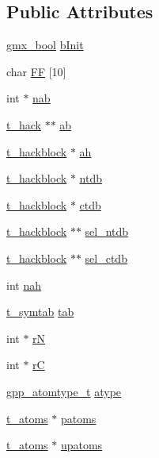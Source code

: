 \subsection*{\-Public \-Attributes}
\begin{DoxyCompactItemize}
\item 
\hyperlink{include_2types_2simple_8h_a8fddad319f226e856400d190198d5151}{gmx\-\_\-bool} \hyperlink{structt__protonate_a8290815626bfc9c61018e18676c82664}{b\-Init}
\item 
char \hyperlink{structt__protonate_ad3acc79a6fc03e541a71b2d74352855d}{\-F\-F} \mbox{[}10\mbox{]}
\item 
int $\ast$ \hyperlink{structt__protonate_a4857a140a9f0d6740dfe772ed4524b62}{nab}
\item 
\hyperlink{structt__hack}{t\-\_\-hack} $\ast$$\ast$ \hyperlink{structt__protonate_aff0d02f8787f57c387e52de040c5e402}{ab}
\item 
\hyperlink{structt__hackblock}{t\-\_\-hackblock} $\ast$ \hyperlink{structt__protonate_a9a1267245f8d9e479835de82909f5233}{ah}
\item 
\hyperlink{structt__hackblock}{t\-\_\-hackblock} $\ast$ \hyperlink{structt__protonate_a2c4add1c540a11ab1c69e956a4cb0422}{ntdb}
\item 
\hyperlink{structt__hackblock}{t\-\_\-hackblock} $\ast$ \hyperlink{structt__protonate_abbba436e07c0e9547436ebe40bab4e22}{ctdb}
\item 
\hyperlink{structt__hackblock}{t\-\_\-hackblock} $\ast$$\ast$ \hyperlink{structt__protonate_a1597a630a1caa00a4e78b0975ad0ecbb}{sel\-\_\-ntdb}
\item 
\hyperlink{structt__hackblock}{t\-\_\-hackblock} $\ast$$\ast$ \hyperlink{structt__protonate_a54953c6e30be706882685c61673a0171}{sel\-\_\-ctdb}
\item 
int \hyperlink{structt__protonate_a608bec6fd285edc3bc004ccedafeee4e}{nah}
\item 
\hyperlink{structt__symtab}{t\-\_\-symtab} \hyperlink{structt__protonate_a0884a371331dfccef55c8fa4cade5627}{tab}
\item 
int $\ast$ \hyperlink{structt__protonate_a9aed18a32037e2cfae82a61fa99a0977}{r\-N}
\item 
int $\ast$ \hyperlink{structt__protonate_a349f9992494b7590edffe78275bc836d}{r\-C}
\item 
\hyperlink{include_2gpp__atomtype_8h_a140a52ba2b384d9a6483fe65c780f110}{gpp\-\_\-atomtype\-\_\-t} \hyperlink{structt__protonate_ad25ec2be60fa9e54f569309e56f0e61e}{atype}
\item 
\hyperlink{structt__atoms}{t\-\_\-atoms} $\ast$ \hyperlink{structt__protonate_ac10f0afbf81358a654fb36f2af95452a}{patoms}
\item 
\hyperlink{structt__atoms}{t\-\_\-atoms} $\ast$ \hyperlink{structt__protonate_add76a930db538f374e783c8de0d4958e}{upatoms}
\end{DoxyCompactItemize}


